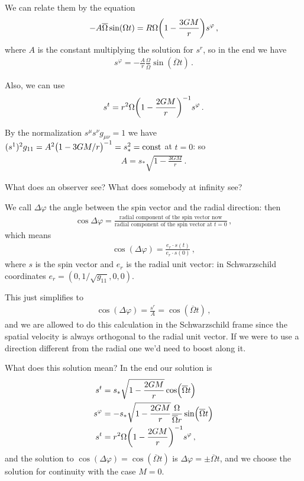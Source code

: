 \documentclass[main.tex]{subfiles}
\begin{document}
We can relate them by the equation 
%
\begin{align}
  - A  \overline{\Omega} \sin(\Omega t) = R \Omega \qty(1 - \frac{3GM}{r}) s^{\varphi }
\,,
\end{align}
%
where \(A\) is the constant multiplying the solution for \(s^{r}\), so in the end we have 
%
\begin{align}
  s^{\varphi } = - \frac{A}{r} \frac{\Omega}{\overline{\Omega}} \sin(\overline{\Omega} t)
\,.
\end{align}

Also, we can use 
%
\begin{align}
  s^{t} = r^2 \Omega \qty(1 - \frac{2GM}{r})^{-1} s^{\varphi }
\,.
\end{align}

By the normalization \(s^{\mu } s^{\nu } g_{\mu \nu } = 1\) we have \((s^{1})^2 g_{11} = A^2 \qty(1 - 3GM/r)^{-1}=s_{*}^2 = \text{const}\) at \(t=0\): so 
%
\begin{align}
  A = s_{*} \sqrt{1 - \frac{3GM}{r}}
\,.
\end{align}

What does an observer see? What does somebody at infinity see? 

We call \(\Delta \varphi \) the angle between the spin vector and the radial direction: then 
%
\begin{align}
  \cos \Delta \varphi  = \frac{\text{radial component of the spin vector now}}{\text{radial component of the spin vector at }  t=0}
\,,
\end{align}
%
which means 
%
\begin{align}
  \cos(\Delta \varphi ) = \frac{e_{r} \cdot s (t)}{e_r \cdot s(0)}
\,,
\end{align}
%
where \(s\) is the spin vector and \(e_r\) is the radial unit vector: in Schwarzschild coordinates \(e_{r} = (0, 1/\sqrt{g_{11} } , 0, 0)\). 

This just simplifies to 
%
\begin{align}
  \cos(\Delta \varphi ) = \frac{s^{r}}{A} = \cos(\overline{\Omega}t)
\,,
\end{align}
%
and we are allowed to do this calculation in the Schwarzschild frame since the spatial velocity is always orthogonal to the radial unit vector. 
If we were to use a direction different from the radial one we'd need to boost along it.   

What does this solution mean? In the end our solution is 
%
\begin{align}
  s^{t} &= s_{*} \sqrt{1 - \frac{2GM}{r}} \cos(\overline{\Omega} t)  \\
s^{\varphi } &= - s_{* } \sqrt{1 - \frac{2GM}{r}} \frac{\Omega}{\overline{\Omega} r} \sin(\overline{\Omega} t)  \\
 s^{t} &= r^{2} \Omega \qty(1 - \frac{2GM}{r})^{-1} s^{\varphi }
\,,
\end{align}
%
and the solution to \(\cos(\Delta \varphi ) = \cos(\overline{\Omega} t)\) is \(\Delta \varphi = \pm \overline{\Omega} t\), and we choose the solution for continuity with the case \(M=0\). 
\end{document}
